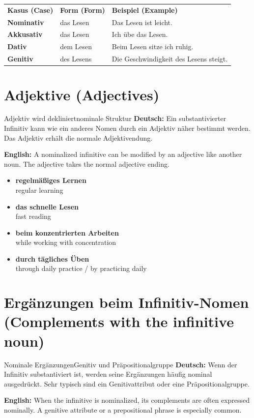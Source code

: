 \documentclass[a4paper,11pt]{article}
\newcommand{\GermanText}[1]{\textbf{Deutsch: }#1\par}
\newcommand{\EnglishText}[1]{{\small\color{SoftGray}\textbf{English: }#1\par}}
\newcommand{\ExampleItem}[2]{\item \textbf{#1}\\{\small\color{SoftGray}#2}}
\begin{document}
\begin{longtable}{>{\bfseries}p{3cm}|p{5.0cm}|p{5.3cm}}
\rowcolor{HeaderBlueDark}
\color{white}\textbf{Kasus (Case)} & \color{white}\textbf{Form (Form)} & \color{white}\textbf{Beispiel (Example)} \\
Nominativ & das Lesen & Das Lesen ist leicht. \\
Akkusativ & das Lesen & Ich übe das Lesen. \\
Dativ & dem Lesen & Beim Lesen sitze ich ruhig. \\
Genitiv & des Lesens & Die Geschwindigkeit des Lesens steigt. \\
\end{longtable}

\section{Adjektive \textnormal{(Adjectives)}}
\begin{grammarentry}{Adjektiv wird dekliniert}{nominale Struktur}
\GermanText{Ein substantivierter Infinitiv kann wie ein anderes Nomen durch ein Adjektiv näher bestimmt werden. Das Adjektiv erhält die normale Adjektivendung.}
\EnglishText{A nominalized infinitive can be modified by an adjective like another noun. The adjective takes the normal adjective ending.}
\end{grammarentry}

\begin{exbox}
\begin{itemize}
\ExampleItem{regelmäßiges Lernen}{regular learning}
\ExampleItem{das schnelle Lesen}{fast reading}
\ExampleItem{beim konzentrierten Arbeiten}{while working with concentration}
\ExampleItem{durch tägliches Üben}{through daily practice / by practicing daily}
\end{itemize}
\end{exbox}

\section{Ergänzungen beim Infinitiv-Nomen \textnormal{(Complements with the infinitive noun)}}
\begin{grammarentry}{Nominale Ergänzungen}{Genitiv und Präpositionalgruppe}
\GermanText{Wenn der Infinitiv substantiviert ist, werden seine Ergänzungen häufig nominal ausgedrückt. Sehr typisch sind ein Genitivattribut oder eine Präpositionalgruppe.}
\EnglishText{When the infinitive is nominalized, its complements are often expressed nominally. A genitive attribute or a prepositional phrase is especially common.}
\end{grammarentry}
\end{document}
